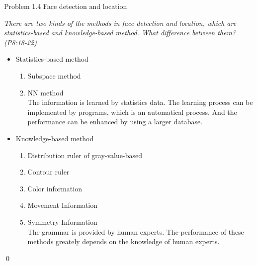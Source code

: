 \documentclass[
        ]{beamer}
\begin{document}
    		\begin{frame}[t]{Problem 1.4 Face detection and location}    		
    			\begin{overprint}
    			\emph{There are two kinds of the methods in face detection and location, which are statistics-based and knowledge-based method. What difference between them? (P8:18-22)}
    			\onslide<2> 
    			\onslide<3> 
    			\onslide<4> 
    			\onslide<5> 
    			\onslide<6> 
    			\onslide<7>    			
    				\begin{itemize}
    					\item Statistics-based method
    					\begin{enumerate}
    						\item Subspace method
    						\item NN method\\
    						\alert{The information is learned by statistics data. The learning process can be implemented by programs, which is an automatical process. And the performance can be enhanced by using a larger database.}
							\end{enumerate}
							\item Knowledge-based method
    					\begin{enumerate}
								\item Distribution ruler of gray-value-based
								\item Contour ruler
								\item Color information
								\item Movement Information
								\item Symmetry Information	\\
    						\alert{The grammar is provided by human experts. The performance of these methods greately depends on the knowledge of human experts.}
							\end{enumerate}
    				\end{itemize}		
    			\qed		
    			\end{overprint}
    		\end{frame}
    
\end{document}
